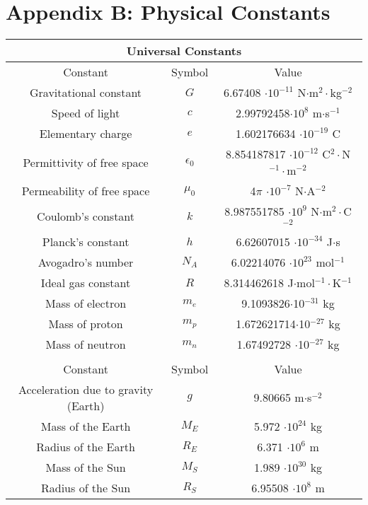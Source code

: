 \section*{Appendix B: Physical Constants}
\begin{center}
\begin{tabular}{c c c}
	\multicolumn{3}{c}{Universal Constants}\\[3pt] \hline  \noalign{\smallskip}
	Constant & Symbol & Value \\[3pt] \hline \hline \noalign{\smallskip}
	Gravitational constant & $G$ & 6.67408 $\cdot 10^{-11}$ N$\cdot$m$^2\cdot$kg$^{-2}$\\[3pt] \hline \noalign{\smallskip}
	Speed of light & $c$ & 2.99792458$\cdot 10^8$ m$\cdot$s$^{-1}$\\[3pt] \hline \noalign{\smallskip}
	Elementary charge & $e$ & 1.602176634 $\cdot 10^{-19}$ C \\[3pt] \hline  \noalign{\smallskip}
	Permittivity of free space & $\epsilon_0$ & 8.854187817 $\cdot 10^{-12}$ C$^2\cdot$N$^{-1}\cdot$m$^{-2}$\\[3pt] \hline  \noalign{\smallskip}
	Permeability of free space & $\mu_0$ & 4$\pi$ $\cdot 10^{-7}$ N$\cdot$A$^{-2}$\\[3pt] \hline  \noalign{\smallskip}
	Coulomb's constant & $k$ & 8.987551785 $\cdot 10^9$ N$\cdot$m$^2\cdot$C$^{-2}$ \\[3pt] \hline  \noalign{\smallskip}
	Planck's constant & $h$ & 6.62607015 $\cdot 10^{-34}$ J$\cdot$s \\[3pt] \hline  \noalign{\smallskip}
	Avogadro's number & $N_A$ & 6.02214076 $\cdot 10^{23}$ mol$^{-1}$ \\[3pt] \hline  \noalign{\smallskip}
	Ideal gas constant & $R$ & 8.314462618 J$\cdot$mol$^{-1}\cdot$K$^{-1}$ \\[3pt] \hline  \noalign{\smallskip}
	Mass of electron & $m_e$ & 9.1093826$\cdot$10$^{-31}$ kg\\[3pt] \hline  \noalign{\smallskip}
	Mass of proton & $m_p$ & 1.672621714$\cdot$10$^{-27}$ kg\\[3pt] \hline  \noalign{\smallskip}
	Mass of neutron & $m_n$ & 1.67492728 $\cdot$10$^{-27}$ kg \\[3pt] \hline \hline \noalign{\smallskip}
	\multicolumn{3}{c}{Terrestrial and Astronomical Data}\\[3pt] \hline  \noalign{\smallskip}
	Constant & Symbol & Value \\[3pt] \hline \hline \noalign{\smallskip}
	Acceleration due to gravity (Earth)& $g$ & 9.80665 m$\cdot$s$^{-2}$\\[3pt]\hline \noalign{\smallskip}
	Mass of the Earth & $M_E$ & 5.972 $\cdot 10^{24}$ kg\\[3pt] \hline  \noalign{\smallskip}
	Radius of the Earth & $R_E$ & 6.371 $\cdot 10^6$ m\\[3pt] \hline \noalign{\smallskip}
	Mass of the Sun & $M_S$ & 1.989 $\cdot 10^{30}$ kg\\[3pt] \hline  \noalign{\smallskip}
	Radius of the Sun & $R_S$ & 6.95508 $\cdot 10^8$ m\\[3pt] \hline \hline 
\end{tabular}
\end{center}